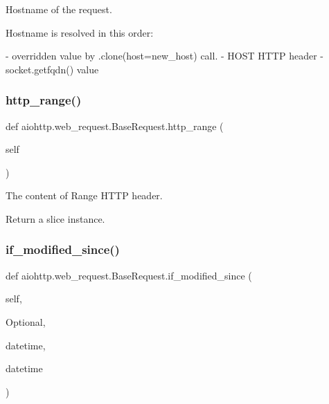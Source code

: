 \begin{DoxyVerb}Hostname of the request.

Hostname is resolved in this order:

- overridden value by .clone(host=new_host) call.
- HOST HTTP header
- socket.getfqdn() value
\end{DoxyVerb}
 \mbox{\label{classaiohttp_1_1web__request_1_1_base_request_a794e7323e158c8a3a1fd87b7ae9eff09}} 
\subsubsection{\texorpdfstring{http\+\_\+range()}{http\_range()}}
{\footnotesize\ttfamily def aiohttp.\+web\+\_\+request.\+Base\+Request.\+http\+\_\+range (\begin{DoxyParamCaption}\item[{}]{self }\end{DoxyParamCaption})}

\begin{DoxyVerb}The content of Range HTTP header.

Return a slice instance.\end{DoxyVerb}
 \mbox{\label{classaiohttp_1_1web__request_1_1_base_request_a2dbf5e046adc0b850ba9cda52fa9cea6}} 
\subsubsection{\texorpdfstring{if\+\_\+modified\+\_\+since()}{if\_modified\_since()}}
{\footnotesize\ttfamily def aiohttp.\+web\+\_\+request.\+Base\+Request.\+if\+\_\+modified\+\_\+since (\begin{DoxyParamCaption}\item[{}]{self,  }\item[{}]{Optional,  }\item[{}]{datetime,  }\item[{}]{datetime }\end{DoxyParamCaption})}

